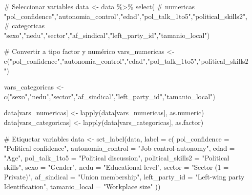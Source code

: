 \documentclass[
  letterpaper,
  DIV=11,
  numbers=noendperiod]{scrreprt}
\newenvironment{Shaded}{\begin{snugshade}}{\end{snugshade}}
\newcommand{\AttributeTok}[1]{\textcolor[rgb]{0.40,0.45,0.13}{#1}}
\newcommand{\CommentTok}[1]{\textcolor[rgb]{0.37,0.37,0.37}{#1}}
\newcommand{\FunctionTok}[1]{\textcolor[rgb]{0.28,0.35,0.67}{#1}}
\newcommand{\NormalTok}[1]{\textcolor[rgb]{0.00,0.23,0.31}{#1}}
\newcommand{\OtherTok}[1]{\textcolor[rgb]{0.00,0.23,0.31}{#1}}
\newcommand{\SpecialCharTok}[1]{\textcolor[rgb]{0.37,0.37,0.37}{#1}}
\newcommand{\StringTok}[1]{\textcolor[rgb]{0.13,0.47,0.30}{#1}}
\begin{document}
\begin{Shaded}
\begin{Highlighting}[]
\CommentTok{\# Seleccionar variables}
\NormalTok{data }\OtherTok{\textless{}{-}}\NormalTok{ data }\SpecialCharTok{\%\textgreater{}\%} 
  \FunctionTok{select}\NormalTok{(}
    \CommentTok{\# numericas}
    \StringTok{"pol\_confidence"}\NormalTok{,}\StringTok{"autonomia\_control"}\NormalTok{,}\StringTok{"edad"}\NormalTok{,}\StringTok{"pol\_talk\_1to5"}\NormalTok{,}\StringTok{"political\_skills2"}\NormalTok{,}
    \CommentTok{\# categoricas}
    \StringTok{"sexo"}\NormalTok{,}\StringTok{"nedu"}\NormalTok{,}\StringTok{"sector"}\NormalTok{,}\StringTok{"af\_sindical"}\NormalTok{,}\StringTok{"left\_party\_id"}\NormalTok{,}\StringTok{"tamanio\_local"}\NormalTok{)}

\CommentTok{\# Convertir a tipo factor y numérico}
\NormalTok{vars\_numericas }\OtherTok{\textless{}{-}} \FunctionTok{c}\NormalTok{(}\StringTok{"pol\_confidence"}\NormalTok{,}\StringTok{"autonomia\_control"}\NormalTok{,}\StringTok{"edad"}\NormalTok{,}\StringTok{"pol\_talk\_1to5"}\NormalTok{,}\StringTok{"political\_skills2"}\NormalTok{)}

\NormalTok{vars\_categoricas }\OtherTok{\textless{}{-}} \FunctionTok{c}\NormalTok{(}\StringTok{"sexo"}\NormalTok{,}\StringTok{"nedu"}\NormalTok{,}\StringTok{"sector"}\NormalTok{,}\StringTok{"af\_sindical"}\NormalTok{,}\StringTok{"left\_party\_id"}\NormalTok{,}\StringTok{"tamanio\_local"}\NormalTok{)}

\NormalTok{data[vars\_numericas] }\OtherTok{\textless{}{-}} \FunctionTok{lapply}\NormalTok{(data[vars\_numericas], as.numeric)}
\NormalTok{data[vars\_categoricas] }\OtherTok{\textless{}{-}} \FunctionTok{lapply}\NormalTok{(data[vars\_categoricas], as.factor)}

\CommentTok{\# Etiquetar variables }
\NormalTok{data }\OtherTok{\textless{}{-}} \FunctionTok{set\_label}\NormalTok{(data, }\AttributeTok{label =} \FunctionTok{c}\NormalTok{(}
  \AttributeTok{pol\_confidence =} \StringTok{"Political confidence"}\NormalTok{,}
  \AttributeTok{autonomia\_control =} \StringTok{"Job control{-}autonomy"}\NormalTok{,}
  \AttributeTok{edad =} \StringTok{"Age"}\NormalTok{,}
  \AttributeTok{pol\_talk\_1to5 =} \StringTok{"Political discussion"}\NormalTok{,}
  \AttributeTok{political\_skills2 =} \StringTok{"Political skills"}\NormalTok{,}
  \AttributeTok{sexo =} \StringTok{"Gender"}\NormalTok{,}
  \AttributeTok{nedu =} \StringTok{"Educational level"}\NormalTok{,}
  \AttributeTok{sector =} \StringTok{"Sector (1 = Private)"}\NormalTok{,}
  \AttributeTok{af\_sindical =} \StringTok{"Union membership"}\NormalTok{,}
  \AttributeTok{left\_party\_id =} \StringTok{"Left{-}wing party Identification"}\NormalTok{,}
  \AttributeTok{tamanio\_local =} \StringTok{"Workplace size"}
\NormalTok{))}
\end{Highlighting}
\end{Shaded}
\end{document}
